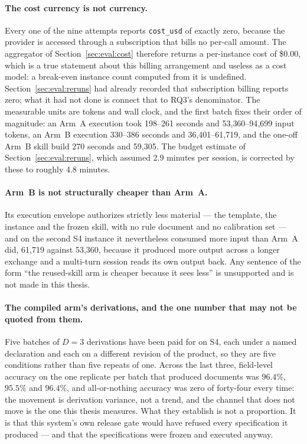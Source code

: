 \paragraph{The cost currency is not currency.}
Every one of the nine attempts reports \texttt{cost\_usd} of exactly zero, because the
provider is accessed through a subscription that bills no per-call amount. The aggregator of
Section~\ref{sec:eval:cost} therefore returns a per-instance cost of \$0.00, which is a true
statement about this billing arrangement and useless as a cost model: a break-even instance
count computed from it is undefined. Section~\ref{sec:eval:reruns} had already recorded that
subscription billing reports zero; what it had not done is connect that to RQ3's denominator.
The measurable units are tokens and wall clock, and the first batch fixes their order of
magnitude: an Arm~A execution took 198--261 seconds and 53{,}360--94{,}699 input tokens, an
Arm~B execution 330--386 seconds and 36{,}401--61{,}719, and the one-off Arm~B skill build 270
seconds and 59{,}305. The budget estimate of Section~\ref{sec:eval:reruns}, which assumed
2.9 minutes per session, is corrected by these to roughly 4.8 minutes.

\paragraph{Arm~B is not structurally cheaper than Arm~A.}
Its execution envelope authorizes strictly less material --- the template, the instance and the
frozen skill, with no rule document and no calibration set --- and on the second S4 instance it
nevertheless consumed more input than Arm~A did, 61{,}719 against 53{,}360, because it produced
more output across a longer exchange and a multi-turn session reads its own output back. Any
sentence of the form ``the reused-skill arm is cheaper because it sees less'' is unsupported and
is not made in this thesis.

\paragraph{The compiled arm's derivations, and the one number that may not be quoted
from them.}
Five batches of $D=3$ derivations have been paid for on S4, each under a named declaration and
each on a different revision of the product, so they are five conditions rather than five
repeats of one. Across the last three, field-level accuracy on the one replicate per batch that
produced documents was $96.4\%$, $95.5\%$ and $96.4\%$, and all-or-nothing accuracy was zero of
forty-four every time: the movement is derivation variance, not a trend, and the channel that
does not move is the one this thesis measures. What they establish is not a proportion. It is that this system's own release
gate would have refused every specification it produced --- and that the specifications were
frozen and executed anyway.

